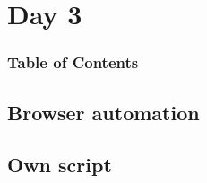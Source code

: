 \documentclass[english,aspectratio=169]{beamer}
\begin{document}


\section{Day 3}

\begin{frame}
    \frametitle{Table of Contents}
    \tableofcontents[currentsection]
\end{frame}

\subsection{Browser automation}



\subsection{Own script}


\end{document}
